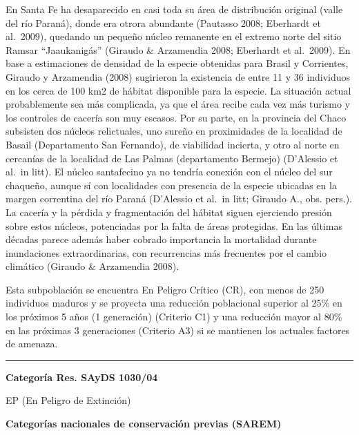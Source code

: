 \documentclass[
]{article}
\begin{document}
En Santa Fe ha desaparecido en casi toda su área de distribución
original (valle del río Paraná), donde era otrora abundante (Pautasso
2008; Eberhardt et al.~2009), quedando un pequeño núcleo remanente en el
extremo norte del sitio Ramsar ``Jaaukanigás'' (Giraudo \& Arzamendia
2008; Eberhardt et al.~2009). En base a estimaciones de densidad de la
especie obtenidas para Brasil y Corrientes, Giraudo y Arzamendia (2008)
sugirieron la existencia de entre 11 y 36 individuos en los cerca de 100
km2 de hábitat disponible para la especie. La situación actual
probablemente sea más complicada, ya que el área recibe cada vez más
turismo y los controles de cacería son muy escasos. Por su parte, en la
provincia del Chaco subsisten dos núcleos relictuales, uno sureño en
proximidades de la localidad de Basail (Departamento San Fernando), de
viabilidad incierta, y otro al norte en cercanías de la localidad de Las
Palmas (departamento Bermejo) (D'Alessio et al.~in litt). El núcleo
santafecino ya no tendría conexión con el núcleo del sur chaqueño,
aunque sí con localidades con presencia de la especie ubicadas en la
margen correntina del río Paraná (D'Alessio et al.~in litt; Giraudo A.,
obs. pers.). La cacería y la pérdida y fragmentación del hábitat siguen
ejerciendo presión sobre estos núcleos, potenciadas por la falta de
áreas protegidas. En las últimas décadas parece además haber cobrado
importancia la mortalidad durante inundaciones extraordinarias, con
recurrencias más frecuentes por el cambio climático (Giraudo \&
Arzamendia 2008).

Esta subpoblación se encuentra En Peligro Crítico (CR), con menos de 250
individuos maduros y se proyecta una reducción poblacional superior al
25\% en los próximos 5 años (1 generación) (Criterio C1) y una reducción
mayor al 80\% en las próximas 3 generaciones (Criterio A3) si se
mantienen los actuales factores de amenaza.

\begin{center}\rule{0.5\linewidth}{0.5pt}\end{center}

\textbf{Categoría Res. SAyDS 1030/04}

EP (En Peligro de Extinción)

\textbf{Categorías nacionales de conservación previas (SAREM)}
\end{document}
